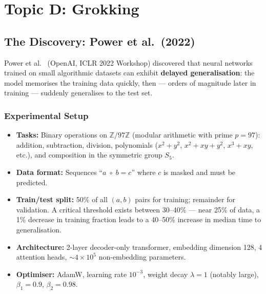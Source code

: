 \documentclass[11pt, a4paper]{article}
\theoremstyle{definition}
\theoremstyle{plain}
\newcommand{\Z}{\mathbb{Z}}
\begin{document}
\section{Topic D: Grokking}
\label{sec:grokking}

\subsection{The Discovery: Power et al.\ (2022)}
\label{subsec:power}

Power et al.~\cite{power2022grokking} (OpenAI, ICLR 2022 Workshop) discovered that neural networks trained on small algorithmic datasets can exhibit \textbf{delayed generalisation}: the model memorises the training data quickly, then --- orders of magnitude later in training --- suddenly generalises to the test set.

\subsubsection{Experimental Setup}

\begin{itemize}
  \item \textbf{Tasks:} Binary operations on $\Z/97\Z$ (modular arithmetic with prime $p = 97$): addition, subtraction, division, polynomials ($x^2 + y^2$, $x^2 + xy + y^2$, $x^3 + xy$, etc.), and composition in the symmetric group $S_5$.
  \item \textbf{Data format:} Sequences ``$a \;\circ\; b = c$'' where $c$ is masked and must be predicted.
  \item \textbf{Train/test split:} 50\% of all $(a,b)$ pairs for training; remainder for validation. A critical threshold exists between 30--40\% --- near 25\% of data, a 1\% decrease in training fraction leads to a 40--50\% increase in median time to generalisation.
  \item \textbf{Architecture:} 2-layer decoder-only transformer, embedding dimension 128, 4 attention heads, ${\sim}4 \times 10^5$ non-embedding parameters.
  \item \textbf{Optimiser:} AdamW, learning rate $10^{-3}$, weight decay $\lambda = 1$ (notably large), $\beta_1 = 0.9$, $\beta_2 = 0.98$.
\end{itemize}
\end{document}
